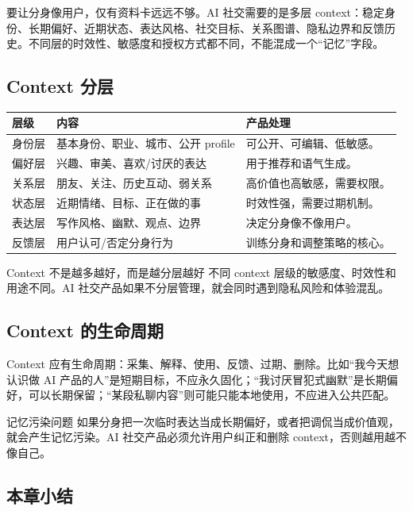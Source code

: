 \documentclass[a4paper]{article}
\begin{document}
要让分身像用户，仅有资料卡远远不够。AI 社交需要的是多层 context：稳定身份、长期偏好、近期状态、表达风格、社交目标、关系图谱、隐私边界和反馈历史。不同层的时效性、敏感度和授权方式都不同，不能混成一个“记忆”字段。

\subsection{Context 分层}

\noindent\begin{longtable}{p{}p{}p{}}
\toprule
层级 & 内容 & 产品处理 \\
\midrule
身份层 & 基本身份、职业、城市、公开 profile & 可公开、可编辑、低敏感。 \\
偏好层 & 兴趣、审美、喜欢/讨厌的表达 & 用于推荐和语气生成。 \\
关系层 & 朋友、关注、历史互动、弱关系 & 高价值也高敏感，需要权限。 \\
状态层 & 近期情绪、目标、正在做的事 & 时效性强，需要过期机制。 \\
表达层 & 写作风格、幽默、观点、边界 & 决定分身像不像用户。 \\
反馈层 & 用户认可/否定分身行为 & 训练分身和调整策略的核心。 \\
\bottomrule
\end{longtable}

\begin{importantbox}{Context 不是越多越好，而是越分层越好}
不同 context 层级的敏感度、时效性和用途不同。AI 社交产品如果不分层管理，就会同时遇到隐私风险和体验混乱。
\end{importantbox}

\subsection{Context 的生命周期}

Context 应有生命周期：采集、解释、使用、反馈、过期、删除。比如“我今天想认识做 AI 产品的人”是短期目标，不应永久固化；“我讨厌冒犯式幽默”是长期偏好，可以长期保留；“某段私聊内容”则可能只能本地使用，不应进入公共匹配。

\begin{warningbox}{记忆污染问题}
如果分身把一次临时表达当成长期偏好，或者把调侃当成价值观，就会产生记忆污染。AI 社交产品必须允许用户纠正和删除 context，否则越用越不像自己。
\end{warningbox}

\subsection{本章小结}
\end{document}

